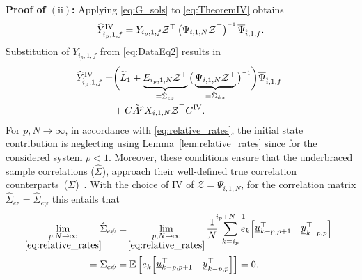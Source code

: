 \noindent\textbf{Proof of $(\mathrm{ii})$:} Applying \eqref{eq:G_sols} to \eqref{eq:TheoremIV} obtains
\begin{align}\label{eq:Yfhat_1}
    \widehat{Y}_{\hat{i}_p,1,f}^\mathrm{IV} = Y_{i_p,1,f}\mathcal{Z}^\top\left(\Psi_{i,1,N}\mathcal{Z}^\top\right)\inv\overline{\Psi}_{\hat{i},1,f}.
\end{align}
Substitution of $Y_{i_p,1,f}$ from \eqref{eq:DataEq2} results in
\begin{align}\label{eq:Yfhat_2}
    \begin{split}
        \mkern-6mu\widehat{Y}_{\hat{i}_p,1,f}^\mathrm{IV} = &\bigg(\widetilde{L}_1  + \underbrace{E_{i_p,1,N}\mathcal{Z}^\top}_{=\hat{\Sigma}_{ez}}\big(\underbrace{\Psi_{i,1,N}\mathcal{Z}^\top}_{=\hat{\Sigma}_{\psi z}}\big)\inv\bigg) \overline{\Psi}_{\hat{i},1,f}\\%
        &+ C \tilde{A}^p X_{i,1,N}\mathcal{Z}^\top G^\mathrm{IV}.
    \end{split}
\end{align}
For $p,N\rightarrow\infty$, in accordance with \eqref{eq:relative_rates}, the initial state contribution is neglecting using Lemma~\ref{lem:relative_rates} since for the considered system $\rho<1$. Moreover, these conditions ensure that the underbraced sample correlations ($\hat{\Sigma}$), approach their well-defined true correlation counterparts~($\Sigma$)~\citep{Chiuso2007,Bauer2002}. With the choice of \ac{IV} of $\mathcal{Z}=\Psi_{i,1,N}$, for the correlation matrix $\hat{\Sigma}_{ez}=\hat{\Sigma}_{e\psi}$ this entails that
\begin{align}\label{eq:E_Phi_correlation}
    \!\!\!\!\begin{split}
        \lim_{\underset{\eqref{eq:relative_rates}}{p,N\rightarrow\infty}}\!\!\hat{\Sigma}_{e\psi} &= \!\lim_{\underset{\eqref{eq:relative_rates}}{p,N\rightarrow\infty}}\frac{1}{N}\;\sum\limits_{k=i_p}^{\mathclap{i_p+N-1}} e_k\!\begin{bmatrix}\datavec{u}{k-p,p+1}^\top & \datavec{y}{k-p,p}^\top \end{bmatrix}\\
        =\Sigma_{e\psi} &=\mathbb{E}\left[e_k\!\begin{bmatrix}\datavec{u}{k-p,p+1}^\top & \datavec{y}{k-p,p}^\top \end{bmatrix}\right]=0.
    \end{split}
\end{align}

